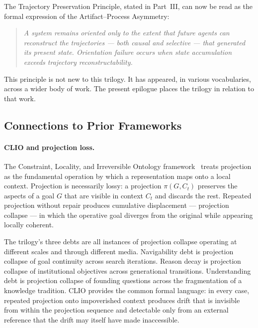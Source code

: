 The Trajectory Preservation Principle, stated in Part~III, can now be read
as the formal expression of the Artifact--Process Asymmetry:

\begin{quote}
\itshape
A system remains oriented only to the extent that future agents can reconstruct
the trajectories --- both causal and selective --- that generated its present
state. Orientation failure occurs when state accumulation exceeds trajectory
reconstructability.
\end{quote}

This principle is not new to this trilogy. It has appeared, in various
vocabularies, across a wider body of work. The present epilogue places the
trilogy in relation to that work.

\subsection*{Connections to Prior Frameworks}

\paragraph{CLIO and projection loss.}
The Constraint, Locality, and Irreversible Ontology framework~\cite{clio2025}
treats projection as the fundamental operation by which a representation maps
onto a local context. Projection is necessarily lossy: a projection $\pi(G,
C_t)$ preserves the aspects of a goal $G$ that are visible in context $C_t$
and discards the rest. Repeated projection without repair produces cumulative
displacement --- projection collapse --- in which the operative goal diverges
from the original while appearing locally coherent.

The trilogy's three debts are all instances of projection collapse operating
at different scales and through different media. Navigability debt is projection
collapse of goal continuity across search iterations. Reason decay is projection
collapse of institutional objectives across generational transitions. Understanding
debt is projection collapse of founding questions across the fragmentation of
a knowledge tradition. CLIO provides the common formal language: in every
case, repeated projection onto impoverished context produces drift that is
invisible from within the projection sequence and detectable only from an
external reference that the drift may itself have made inaccessible.

